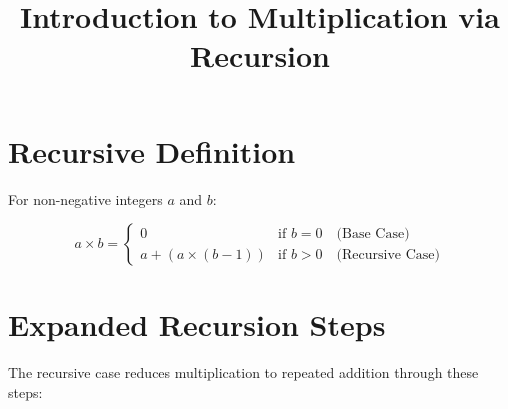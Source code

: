 \documentclass{article}
\title{Introduction to Multiplication via Recursion}
\begin{document}
\maketitle

\section{Recursive Definition}
For non-negative integers \(a\) and \(b\):

\[
    a \times b = \begin{cases}
        0                      & \text{if } b = 0 \quad \text{(Base Case)}      \\
        a + (a \times (b - 1)) & \text{if } b > 0 \quad \text{(Recursive Case)}
    \end{cases}
\]

\section{Expanded Recursion Steps}
The recursive case reduces multiplication to repeated addition through these steps:
\end{document}
